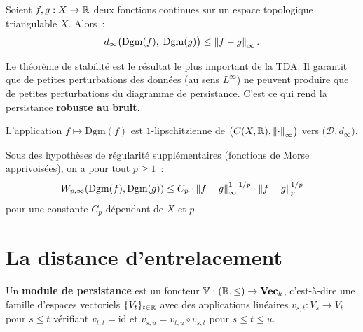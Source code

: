 \begin{theoreme}
\label{thm:stabilite}
Soient $f, g : X \to \mathbb{R}$ deux fonctions continues sur un espace
topologique triangulable $X$. Alors~:
\[
  d_\infty\bigl(\mathrm{Dgm}(f),\; \mathrm{Dgm}(g)\bigr) \leq
  \left\| f - g \right\|_\infty.
\]
\end{theoreme}

\begin{intuition}
Le th\'eor\`eme de stabilit\'e est le r\'esultat le plus important de la TDA.
Il garantit que de petites perturbations des donn\'ees (au sens $L^\infty$)
ne peuvent produire que de petites perturbations du diagramme de persistance.
C'est ce qui rend la persistance \textbf{robuste au bruit}.
\end{intuition}

\begin{corollaire}
L'application $f \mapsto \mathrm{Dgm}(f)$ est $1$-lipschitzienne de
$\bigl(C(X, \mathbb{R}), \left\| \cdot \right\|_\infty\bigr)$ vers
$\bigl(\mathcal{D}, d_\infty\bigr)$.
\end{corollaire}

\begin{theoreme}
Sous des hypoth\`eses de r\'egularit\'e suppl\'ementaires (fonctions de
Morse apprivois\'ees), on a pour tout $p \geq 1$~:
\[
  W_{p,\infty}(\mathrm{Dgm}(f), \mathrm{Dgm}(g)) \leq
  C_p \cdot \left\| f - g \right\|_\infty^{1 - 1/p} \cdot
  \left\| f - g \right\|_{p}^{1/p}
\]
pour une constante $C_p$ d\'ependant de $X$ et $p$.
\end{theoreme}

\section{La distance d'entrelacement}
\label{sec:interleaving}

\begin{definition}
Un \textbf{module de persistance} est un foncteur $\mathbb{V} :
(\mathbb{R}, \leq) \to \mathbf{Vec}_k$, c'est-\`a-dire une famille d'espaces
vectoriels $\{V_t\}_{t \in \mathbb{R}}$ avec des applications lin\'eaires
$v_{s,t} : V_s \to V_t$ pour $s \leq t$ v\'erifiant $v_{t,t} = \mathrm{id}$
et $v_{s,u} = v_{t,u} \circ v_{s,t}$ pour $s \leq t \leq u$.
\end{definition}

